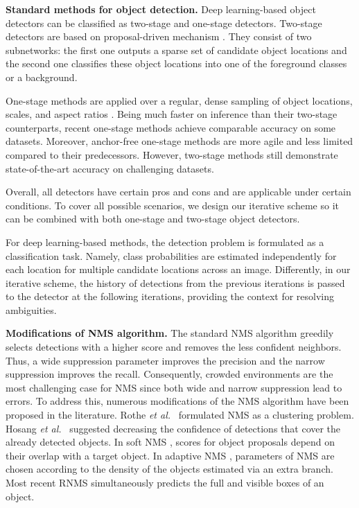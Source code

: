 \documentclass[runningheads]{llncs}
\newcommand{\etal}{\emph{et al.}\ }
\begin{document}
\textbf{Standard methods for object detection.}
Deep learning-based object detectors can be classified as two-stage and one-stage detectors. Two-stage detectors are based on proposal-driven mechanism \cite{girshick2015fast,ren2015faster}. They consist of two subnetworks: the first one outputs a sparse set of candidate object locations and the second one classifies these object locations into one of the foreground classes or a background. 

One-stage methods are applied over a regular, dense sampling of object locations, scales, and aspect ratios \cite{liu2016ssd,lin2017focal}. Being much faster on inference than their two-stage counterparts, recent one-stage methods achieve comparable accuracy on some datasets. Moreover, anchor-free one-stage methods \cite{tian2019fcos} are more agile and less limited compared to their predecessors. However, two-stage methods still demonstrate state-of-the-art accuracy on challenging datasets.

Overall, all detectors have certain pros and cons and are applicable under certain conditions. To cover all possible scenarios, we design our iterative scheme so it can be combined with both one-stage and two-stage object detectors.

For deep learning-based methods, the detection problem is formulated as a classification task. Namely, class probabilities are estimated independently for each location for multiple candidate locations across an image. Differently, in our iterative scheme, the history of detections from the previous iterations is passed to the detector at the following iterations, providing the context for resolving ambiguities.

\textbf{Modifications of NMS algorithm.}
The standard NMS algorithm greedily selects detections with a higher score and removes the less confident neighbors. Thus, a wide suppression parameter improves the precision and the narrow suppression improves the recall. Consequently, crowded environments are the most challenging case for NMS since both wide and narrow suppression lead to errors. To address this, numerous modifications of the NMS algorithm have been proposed in the literature. Rothe \etal \cite{rothe2014non} formulated NMS as a clustering problem. Hosang \etal \cite{hosang2017learning} suggested decreasing the confidence of detections that cover the already detected objects. In soft NMS \cite{bodla2017soft}, scores for object proposals depend on their overlap with a target object. In adaptive NMS \cite{liu2019adaptive}, parameters of NMS are chosen according to the density of the objects estimated via an extra branch. Most recent RNMS \cite{huang2020nms} simultaneously predicts the full and visible boxes of an object. 
\end{document}
